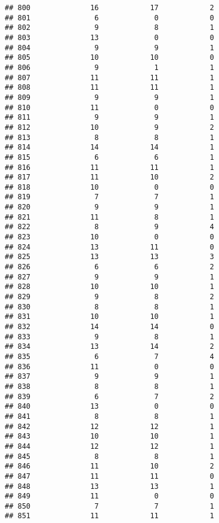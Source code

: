 \documentclass[
]{article}
\begin{document}
\begin{verbatim}
## 800              16            17            2
## 801               6             0            0
## 802               9             8            1
## 803              13             0            0
## 804               9             9            1
## 805              10            10            0
## 806               9             1            1
## 807              11            11            1
## 808              11            11            1
## 809               9             9            1
## 810              11             0            0
## 811               9             9            1
## 812              10             9            2
## 813               8             8            1
## 814              14            14            1
## 815               6             6            1
## 816              11            11            1
## 817              11            10            2
## 818              10             0            0
## 819               7             7            1
## 820               9             9            1
## 821              11             8            1
## 822               8             9            4
## 823              10             0            0
## 824              13            11            0
## 825              13            13            3
## 826               6             6            2
## 827               9             9            1
## 828              10            10            1
## 829               9             8            2
## 830               8             8            1
## 831              10            10            1
## 832              14            14            0
## 833               9             8            1
## 834              13            14            2
## 835               6             7            4
## 836              11             0            0
## 837               9             9            1
## 838               8             8            1
## 839               6             7            2
## 840              13             0            0
## 841               8             8            1
## 842              12            12            1
## 843              10            10            1
## 844              12            12            1
## 845               8             8            1
## 846              11            10            2
## 847              11            11            0
## 848              13            13            1
## 849              11             0            0
## 850               7             7            1
## 851              11            11            1

\end{verbatim}
\end{document}
